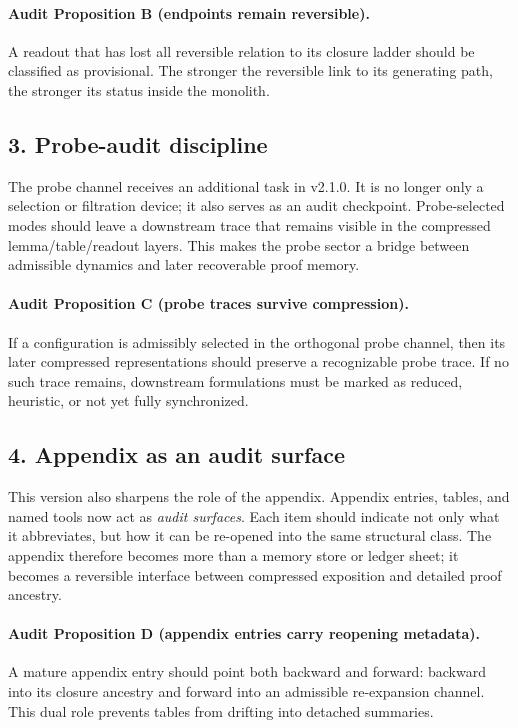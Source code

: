 \paragraph{Audit Proposition B (endpoints remain reversible).}
A readout that has lost all reversible relation to its closure ladder should be
classified as provisional. The stronger the reversible link to its generating
path, the stronger its status inside the monolith.

\subsection*{3. Probe-audit discipline}
The probe channel receives an additional task in v2.1.0. It is no longer
only a selection or filtration device; it also serves as an audit checkpoint.
Probe-selected modes should leave a downstream trace that remains visible in the
compressed lemma/table/readout layers. This makes the probe sector a bridge
between admissible dynamics and later recoverable proof memory.

\paragraph{Audit Proposition C (probe traces survive compression).}
If a configuration is admissibly selected in the orthogonal probe channel, then
its later compressed representations should preserve a recognizable probe trace.
If no such trace remains, downstream formulations must be marked as reduced,
heuristic, or not yet fully synchronized.

\subsection*{4. Appendix as an audit surface}
This version also sharpens the role of the appendix. Appendix entries, tables,
and named tools now act as \emph{audit surfaces}. Each item should indicate not
only what it abbreviates, but how it can be re-opened into the same structural
class. The appendix therefore becomes more than a memory store or ledger sheet;
it becomes a reversible interface between compressed exposition and detailed
proof ancestry.

\paragraph{Audit Proposition D (appendix entries carry reopening metadata).}
A mature appendix entry should point both backward and forward: backward into
its closure ancestry and forward into an admissible re-expansion channel. This
dual role prevents tables from drifting into detached summaries.

